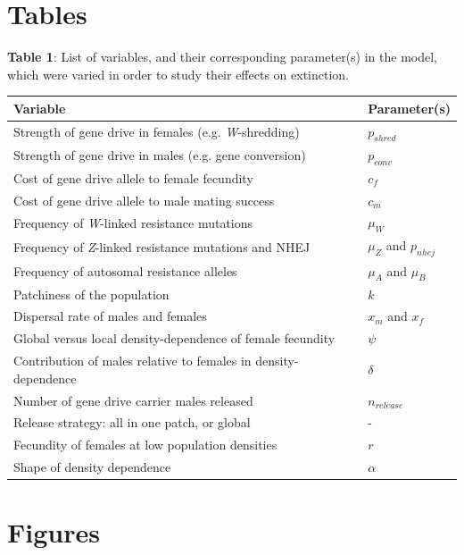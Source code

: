 \documentclass[]{rsos}%
\begin{document}
\newpage

\hypertarget{tables}{%
\section{Tables}\label{tables}}

\textbf{Table 1}: List of variables, and their corresponding
parameter(s) in the model, which were varied in order to study their
effects on extinction.

\begin{table}[ht]
\centering
\begin{tabular}{ll}
  \hline
Variable & Parameter(s) \\ 
  \hline
Strength of gene drive in females (e.g. \textit{W}-shredding) & $p_{shred}$ \\ 
  Strength of gene drive in males (e.g. gene conversion) & $p_{conv}$ \\ 
  Cost of gene drive allele to female fecundity & $c_f$ \\ 
  Cost of gene drive allele to male mating success & $c_m$ \\ 
  Frequency of \textit{W}-linked resistance mutations & $\mu_W$ \\ 
  Frequency of \textit{Z}-linked resistance mutations and NHEJ & $\mu_Z$ and $p_{nhej}$ \\ 
  Frequency of autosomal resistance alleles & $\mu_A$ and $\mu_B$ \\ 
  Patchiness of the population & $k$ \\ 
  Dispersal rate of males and females & $x_m$ and $x_f$ \\ 
  Global versus local density-dependence of female fecundity & $\psi$ \\ 
  Contribution of males relative to females in density-dependence & $\delta$ \\ 
  Number of gene drive carrier males released & $n_{release}$ \\ 
  Release strategy: all in one patch, or global & - \\ 
  Fecundity of females at low population densities & $r$ \\ 
  Shape of density dependence & $\alpha$ \\ 
   \hline
\end{tabular}
\end{table}

\newpage

\hypertarget{figures}{%
\section{Figures}\label{figures}}
\end{document}
